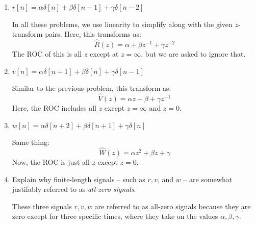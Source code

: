\documentclass[10pt]{article}
\begin{document}
	\begin{enumerate}[label=\alph*)]
		\item \( r[n] = \alpha \delta[n] + \beta \delta[n - 1] + \gamma \delta[n - 2] \) 

			\begin{solution}
				In all these problems, we use linearity to simplify along with the given \( z \)-transform 
				pairs. Here, this transforms as:
				\[
				\hat{R}(z) = \alpha + \beta z^{-1} + \gamma z^{-2}
				\] 
				The ROC of this is all \( z \) except at \( z = \infty \), but we are asked to ignore that. 
			\end{solution}
		\item \( v[n] = \alpha \delta[n + 1] + \beta \delta[n] + \gamma \delta[n - 1] \) 

			\begin{solution}
				Similar to the previous problem, this transform as:
				\[
				\hat{V}(z) = \alpha z + \beta + \gamma z^{-1}
				\] 
				Here, the ROC includes all \( z \) except \( z = \infty \) and \( z = 0 \). 
			\end{solution}
		\item \( w[n] = \alpha \delta[n + 2] + \beta \delta[n + 1] + \gamma \delta[n] \) 

			\begin{solution}
				Same thing:
				\[
				\hat{W}(z) = \alpha z^2 + \beta z + \gamma
				\] 
				Now, the ROC is just all \( z \) except \( z = 0 \).
			\end{solution}
		\item Explain why finite-length signals -- such as \( r, v \),  and \( w \) -- are somewhat 
			justifably referred to as \textit{all-zero signals}.

			\begin{solution}
				These three signals \( r, v, w \) are referred to as all-zero signals because they are zero except 
				for three specific times, where they take on the values \( \alpha, \beta, \gamma\). 
			\end{solution}
	\end{enumerate}
	\pagebreak
\end{document}
